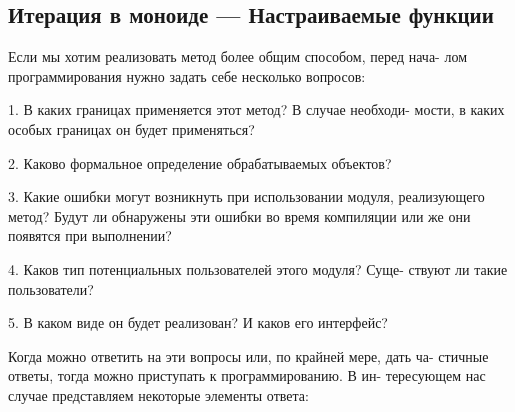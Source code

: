 \subsection{Итерация в моноиде — Настраиваемые функции}


\noindent Если мы хотим реализовать метод более общим способом, перед нача­-\linebreak
лом программирования нужно задать себе несколько вопросов:
\begin{center}
\parbox{12cm}{
1. В каких границах применяется этот метод? В случае необходи­-
  \hspace*{10pt} мости, в каких особых границах он будет применяться?

2. Каково формальное определение обрабатываемых объектов?

3. Какие ошибки могут возникнуть при использовании модуля, \hspace*{10pt}  реализующего метод? Будут ли обнаружены эти ошибки во \hspace*{10pt} время компиляции или же они появятся при выполнении?

4. Каков тип потенциальных пользователей этого модуля? Суще­-
   \hspace*{10pt} ствуют ли такие пользователи?

5. В каком виде он будет реализован? И каков его интерфейс?
}
\end{center}
\noindent Когда можно ответить на эти вопросы или, по крайней мере, дать ча­-\linebreak
стичные ответы, тогда можно приступать к программированию. В ин­-\linebreak
тересующем нас случае представляем некоторые элементы ответа:
